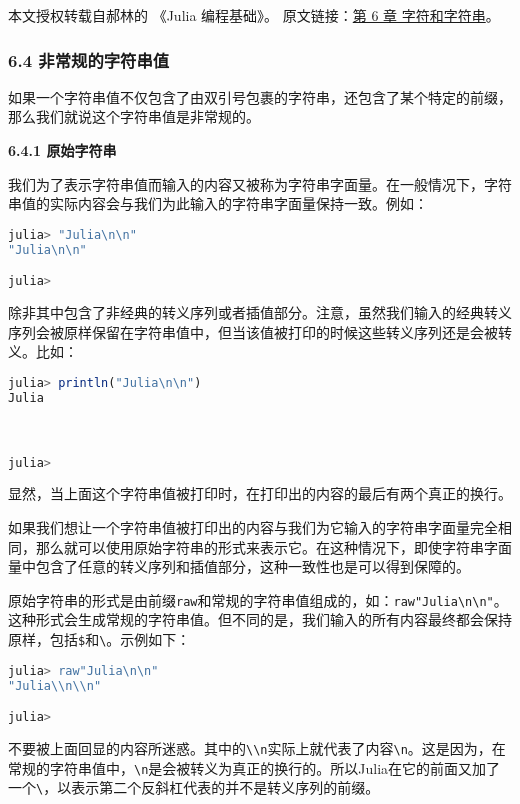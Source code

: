 
本文授权转载自郝林的 《Julia 编程基础》。 原文链接：\href{https://github.com/hyper0x/JuliaBasics/blob/master/book/ch06.md}{第 6 章 字符和字符串}。


\subsubsection{6.4 非常规的字符串值}

如果一个字符串值不仅包含了由双引号包裹的字符串，还包含了某个特定的前缀，那么我们就说这个字符串值是非常规的。

\textbf{6.4.1 原始字符串}

我们为了表示字符串值而输入的内容又被称为字符串字面量。在一般情况下，字符串值的实际内容会与我们为此输入的字符串字面量保持一致。例如：
\begin{lstlisting}[language=julia]
julia> "Julia\n\n"
"Julia\n\n"

julia> 
\end{lstlisting}

除非其中包含了非经典的转义序列或者插值部分。注意，虽然我们输入的经典转义序列会被原样保留在字符串值中，但当该值被打印的时候这些转义序列还是会被转义。比如：
\begin{lstlisting}[language=julia]
julia> println("Julia\n\n")
Julia



julia> 
\end{lstlisting}

显然，当上面这个字符串值被打印时，在打印出的内容的最后有两个真正的换行。

如果我们想让一个字符串值被打印出的内容与我们为它输入的字符串字面量完全相同，那么就可以使用原始字符串的形式来表示它。在这种情况下，即使字符串字面量中包含了任意的转义序列和插值部分，这种一致性也是可以得到保障的。

原始字符串的形式是由前缀\verb|raw|和常规的字符串值组成的，如：\verb|raw"Julia\n\n"|。这种形式会生成常规的字符串值。但不同的是，我们输入的所有内容最终都会保持原样，包括\verb|$|和\verb|\|。示例如下：
\begin{lstlisting}[language=julia]
julia> raw"Julia\n\n"
"Julia\\n\\n"

julia> 
\end{lstlisting}

不要被上面回显的内容所迷惑。其中的\verb|\\n|实际上就代表了内容\verb|\n|。这是因为，在常规的字符串值中，\verb|\n|是会被转义为真正的换行的。所以Julia在它的前面又加了一个\verb|\|，以表示第二个反斜杠代表的并不是转义序列的前缀。

